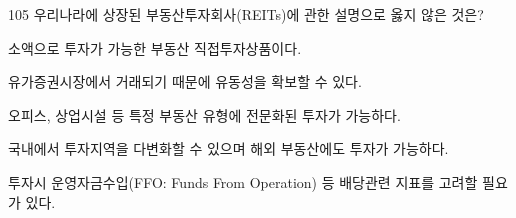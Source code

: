 \begin{question}{105}
우리나라에 상장된 부동산투자회사(REITs)에 관한 설명으로 옳지 않은 것은?
\begin{choices}
  \item 소액으로 투자가 가능한 부동산 직접투자상품이다.
  \item 유가증권시장에서 거래되기 때문에 유동성을 확보할 수 있다.
  \item 오피스, 상업시설 등 특정 부동산 유형에 전문화된 투자가 가능하다.
  \item 국내에서 투자지역을 다변화할 수 있으며 해외 부동산에도 투자가 가능하다.
  \item 투자시 운영자금수입(FFO: Funds From Operation) 등 배당관련 지표를 고려할 필요가 있다.
\end{choices}
\end{question}
